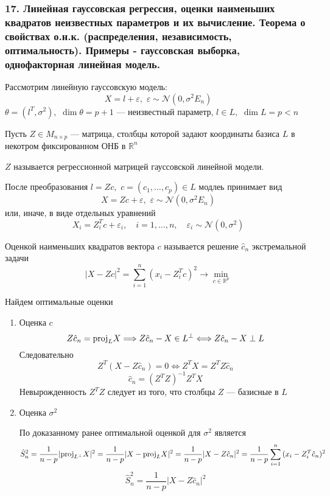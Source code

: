\documentclass[12pt, russian]{article}
\begin{document}
\newpage
\subsubsection*{17. Линейная гауссовская регрессия, оценки наименьших квадратов неизвестных параметров и их вычисление. Теорема о свойствах о.н.к. (распределения, независимость, оптимальность). Примеры - гауссовская выборка, однофакторная линейная модель.}

Рассмотрим линейную гауссовскую модель: 
$$X = l + \varepsilon,\,\, \varepsilon\sim\mathcal{N}(0, \sigma^2E_n)$$
$\theta = (l^T, \sigma^2),\,\,\dim\theta = p+1$ --- неизвестный параметр, $l\in L,\,\,\dim L = p < n$

Пусть $Z\in M_{n\times p}$ --- матрица, столбцы которой задают координаты базиса $L$ в некотром фиксированном ОНБ в $\mathbb{R}^n$

\begin{mydef}
$Z$ называется регрессионной матрицей гауссовской линейной модели.
\end{mydef}
\noindent После преобразования $l=Zc,\,\,c=(c_1,\ldots,c_p)\in L$ модлеь принимает вид
$$X = Zc + \varepsilon,\,\, \varepsilon\sim\mathcal{N}(0, \sigma^2E_n)$$
или, иначе, в виде отдельных уравнений
$$ X_i = Z_i^Tc + \varepsilon_i,\quad i=1,\ldots,n,\quad \varepsilon_i\sim\mathcal{N}(0,\sigma^2)$$

\begin{mydef}
Оценкой наименьших квадратов вектора $c$ называется решение $\hat{c}_n$ экстремальной задачи
$$ |X - Zc|^2 = \sum\limits_{i=1}^n{(x_i - Z_i^Tc)^2} \longrightarrow \min\limits_{c\in\mathbb{R}^p}$$
\end{mydef}

Найдем оптимальные оценки
\begin{enumerate}
\item Оценка $c$
$$ Z\hat{c}_n = \text{proj}_{L}{X} \Longrightarrow Z\hat{c}_n - X \in L^\perp \Longleftrightarrow Z\hat{c}_n - X \perp L$$
Следовательно
$$ Z^T(X- Z\hat{c}_n) = 0 \Longleftrightarrow Z^TX = Z^TZ\hat{c}_n $$ 
$$ \hat{c}_n = (Z^TZ)^{-1}Z^TX $$
Невырожденность $Z^TZ$ следует из того, что столбцы $Z$ --- базисные в $L$

\item Оценка $\sigma^2$

\noindent По доказанному ранее оптимальной оценкой для $\sigma^2$ является
$$ \hat{S}_n^2 = \frac{1}{n-p}|\text{proj}_{L^\perp}{X}|^2 = \frac{1}{n-p}|X - \text{proj}_{L}{X}|^2 = \frac{1}{n-p}|X - Z\hat{c}_n|^2 = \frac{1}{n-p} \sum\limits_{i=1}^n{(x_i - Z_i^T\hat{c}_n)^2}$$
$$ \hat{S}_n^2 =  \frac{1}{n-p}|X - Z\hat{c}_n|^2 $$
\end{enumerate}
\end{document}
